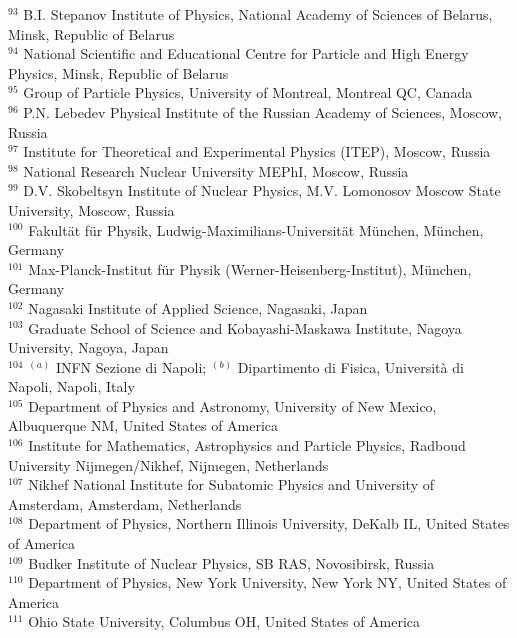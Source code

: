 \begin{flushleft}
$^{93}$ B.I. Stepanov Institute of Physics, National Academy of Sciences of Belarus, Minsk, Republic of Belarus\\
$^{94}$ National Scientific and Educational Centre for Particle and High Energy Physics, Minsk, Republic of Belarus\\
$^{95}$ Group of Particle Physics, University of Montreal, Montreal QC, Canada\\
$^{96}$ P.N. Lebedev Physical Institute of the Russian Academy of Sciences, Moscow, Russia\\
$^{97}$ Institute for Theoretical and Experimental Physics (ITEP), Moscow, Russia\\
$^{98}$ National Research Nuclear University MEPhI, Moscow, Russia\\
$^{99}$ D.V. Skobeltsyn Institute of Nuclear Physics, M.V. Lomonosov Moscow State University, Moscow, Russia\\
$^{100}$ Fakult{\"a}t f{\"u}r Physik, Ludwig-Maximilians-Universit{\"a}t M{\"u}nchen, M{\"u}nchen, Germany\\
$^{101}$ Max-Planck-Institut f{\"u}r Physik (Werner-Heisenberg-Institut), M{\"u}nchen, Germany\\
$^{102}$ Nagasaki Institute of Applied Science, Nagasaki, Japan\\
$^{103}$ Graduate School of Science and Kobayashi-Maskawa Institute, Nagoya University, Nagoya, Japan\\
$^{104}$ $^{(a)}$ INFN Sezione di Napoli; $^{(b)}$ Dipartimento di Fisica, Universit{\`a} di Napoli, Napoli, Italy\\
$^{105}$ Department of Physics and Astronomy, University of New Mexico, Albuquerque NM, United States of America\\
$^{106}$ Institute for Mathematics, Astrophysics and Particle Physics, Radboud University Nijmegen/Nikhef, Nijmegen, Netherlands\\
$^{107}$ Nikhef National Institute for Subatomic Physics and University of Amsterdam, Amsterdam, Netherlands\\
$^{108}$ Department of Physics, Northern Illinois University, DeKalb IL, United States of America\\
$^{109}$ Budker Institute of Nuclear Physics, SB RAS, Novosibirsk, Russia\\
$^{110}$ Department of Physics, New York University, New York NY, United States of America\\
$^{111}$ Ohio State University, Columbus OH, United States of America\\

\end{flushleft}
